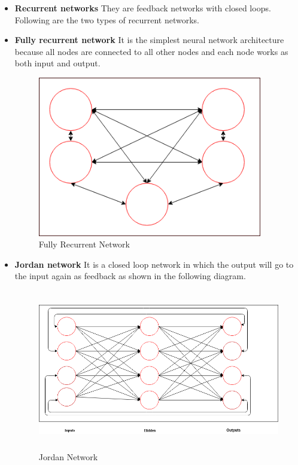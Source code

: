 \documentclass{report}
\begin{document}
\begin{itemize}
\item \textbf{Recurrent networks} They are feedback networks with closed loops. Following are the two types of recurrent networks.

\item \textbf{Fully recurrent network} It is the simplest neural network architecture because all nodes are connected to all other nodes and each node works as both input and output.

\begin{figure}[htbp]
\centering
\includegraphics[height=7cm]{Pictures/fully_recurrent_network.png}
\caption{Fully Recurrent Network}
\label{}
\end{figure}

\item \textbf{Jordan network} It is a closed loop network in which the output will go to the input again as feedback as shown in the following diagram.


\begin{figure}[htbp]
\centering
\includegraphics[height=7cm]{Pictures/Jordan_network.png}
\caption{Jordan Network}
\label{}
\end{figure}

\end{itemize}
\end{document}
